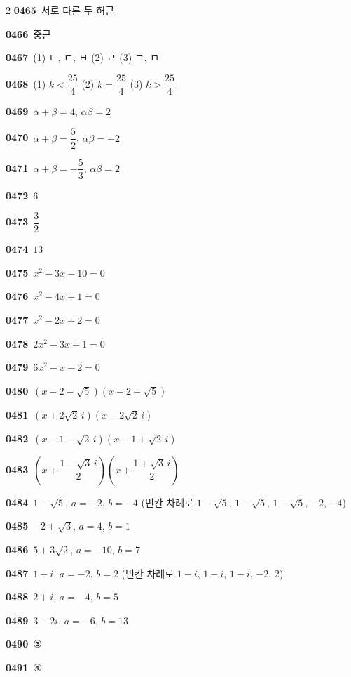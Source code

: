 \documentclass[10pt,a4paper]{article}
\begin{document}
\begin{multicols}{2}
\noindent\textbf{0465}\ 서로 다른 두 허근\par
\noindent\textbf{0466}\ 중근\par
\noindent\textbf{0467}\ (1) ㄴ, ㄷ, ㅂ (2) ㄹ (3) ㄱ, ㅁ\par
\noindent\textbf{0468}\ (1) $k<\dfrac{25}{4}$ (2) $k=\dfrac{25}{4}$ (3) $k>\dfrac{25}{4}$\par
\noindent\textbf{0469}\ $\alpha+\beta=4$, $\alpha\beta=2$\par
\noindent\textbf{0470}\ $\alpha+\beta=\dfrac{5}{2}$, $\alpha\beta=-2$\par
\noindent\textbf{0471}\ $\alpha+\beta=-\dfrac{5}{3}$, $\alpha\beta=2$\par
\noindent\textbf{0472}\ $6$\par
\noindent\textbf{0473}\ $\dfrac{3}{2}$\par
\noindent\textbf{0474}\ $13$\par
\noindent\textbf{0475}\ $x^2-3x-10=0$\par
\noindent\textbf{0476}\ $x^2-4x+1=0$\par
\noindent\textbf{0477}\ $x^2-2x+2=0$\par
\noindent\textbf{0478}\ $2x^2-3x+1=0$\par
\noindent\textbf{0479}\ $6x^2-x-2=0$\par
\noindent\textbf{0480}\ $(x-2-\sqrt{5})(x-2+\sqrt{5})$\par
\noindent\textbf{0481}\ $(x+2\sqrt{2}\,i)(x-2\sqrt{2}\,i)$\par
\noindent\textbf{0482}\ $(x-1-\sqrt{2}\,i)(x-1+\sqrt{2}\,i)$\par
\noindent\textbf{0483}\ $\left(x+\dfrac{1-\sqrt{3}\,i}{2}\right)\left(x+\dfrac{1+\sqrt{3}\,i}{2}\right)$\par
\noindent\textbf{0484}\ $1-\sqrt{5}$, $a=-2$, $b=-4$ (빈칸 차례로 $1-\sqrt{5}$, $1-\sqrt{5}$, $1-\sqrt{5}$, $-2$, $-4$)\par
\noindent\textbf{0485}\ $-2+\sqrt{3}$, $a=4$, $b=1$\par
\noindent\textbf{0486}\ $5+3\sqrt{2}$, $a=-10$, $b=7$\par
\noindent\textbf{0487}\ $1-i$, $a=-2$, $b=2$ (빈칸 차례로 $1-i$, $1-i$, $1-i$, $-2$, $2$)\par
\noindent\textbf{0488}\ $2+i$, $a=-4$, $b=5$\par
\noindent\textbf{0489}\ $3-2i$, $a=-6$, $b=13$\par
\noindent\textbf{0490}\ ③\par
\noindent\textbf{0491}\ ④\par

\end{multicols}
\end{document}
